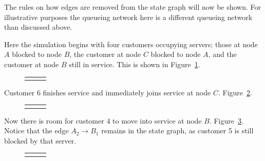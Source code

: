 \documentclass{article}
\begin{document}
The rules on how edges are removed from the state graph will now be shown.
For illustrative purposes the queueing network here is a different queueing network than discussed above.

Here the simulation begins with four customers occupying servers; those at node $A$ blocked to node $B$, the customer at node $C$ blocked to node $A$, and the customer at node $B$ still in service.
This is shown in Figure~\ref{fig:general_builddown_1}.

\begin{figure}[H]
  \begin{center}
    \begin{tabular}{ c c c }
       & \hspace{0.1\textwidth} &
       \\
  \end{tabular}
  \end{center}
  \caption{}
  \label{fig:general_builddown_1}
\end{figure}

Customer 6 finishes service and immediately joins service at node $C$. Figure~\ref{fig:general_builddown_2}.

\begin{figure}[H]
  \begin{center}
    \begin{tabular}{ c c c }
       & \hspace{0.1\textwidth} &
       \\
  \end{tabular}
  \end{center}
  \caption{}
  \label{fig:general_builddown_2}
\end{figure}

Now there is room for customer 4 to move into service at node $B$. Figure~\ref{fig:general_builddown_3}.
Notice that the edge $A_2 \longrightarrow B_1$ remains in the state graph, as customer 5 is still blocked by that server.

\begin{figure}[H]
  \begin{center}
    \begin{tabular}{ c c c }
       & \hspace{0.1\textwidth} &
       \\
  \end{tabular}
  \end{center}
  \caption{}
  \label{fig:general_builddown_3}
\end{figure}
\end{document}
